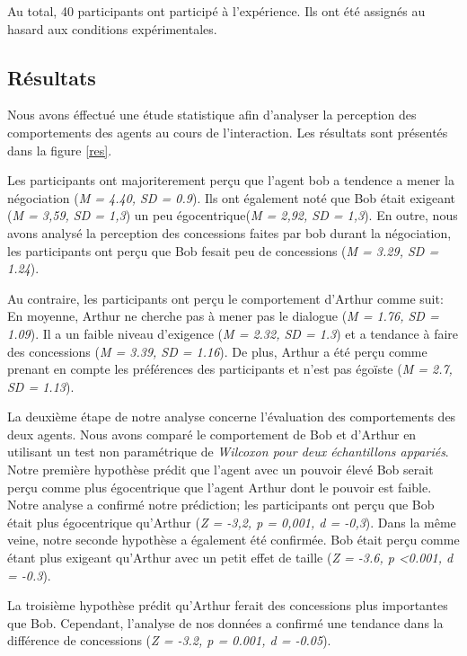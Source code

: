 \documentclass [french]{sig-alternate-05-2015}
\begin{document}
{			Au total, 40 participants ont participé à l'expérience. Ils ont été assignés au hasard aux conditions expérimentales.
			
			\subsection{Résultats}
				Nous avons éffectué une étude statistique afin d'analyser la perception des comportements des agents au cours de l'interaction. Les résultats sont présentés dans la figure \ref{res}.
				
				Les participants ont majoriterement perçu que l'agent bob a tendence a mener la négociation (\emph {M = 4.40, SD = 0.9}). Ils ont également noté que Bob était exigeant (\emph {M = 3,59, SD = 1,3}) un peu égocentrique(\emph {M = 2,92, SD = 1,3}). En outre, nous avons analysé la perception des concessions faites par bob durant la négociation, les participants ont perçu que Bob fesait peu de concessions (\emph {M = 3.29, SD = 1.24}).
				
				Au contraire, les participants ont perçu le comportement d'Arthur comme suit: En moyenne, Arthur ne cherche pas à mener pas le dialogue (\emph {M = 1.76, SD = 1.09}). Il a un faible niveau d'exigence (\emph {M = 2.32, SD = 1.3}) et a tendance à faire des concessions (\emph {M = 3.39, SD = 1.16}). De plus, Arthur a été perçu comme prenant en compte les préférences des participants et n'est pas égoïste (\emph {M = 2.7, SD = 1.13}).
				
				La deuxième étape de notre analyse concerne l'évaluation des comportements des deux agents. Nous avons comparé le comportement de Bob et d'Arthur en utilisant un test non paramétrique de \emph{ Wilcoxon pour deux échantillons appariés}. Notre première hypothèse prédit que l'agent avec un pouvoir élevé Bob serait perçu comme plus égocentrique que l'agent Arthur dont le pouvoir est faible. Notre analyse a confirmé notre prédiction; les participants ont perçu que Bob était plus égocentrique qu'Arthur (\emph {Z = -3,2, p = 0,001, d = -0,3}). Dans la même veine, notre seconde hypothèse a également été confirmée. Bob était perçu comme étant plus exigeant qu'Arthur avec un petit effet de taille (\emph {Z = -3.6, p <0.001, d = -0.3}).
				
				La troisième hypothèse prédit qu'Arthur ferait des concessions plus importantes que Bob. Cependant, l'analyse de nos données a confirmé une tendance dans la différence de concessions (\emph {Z = -3.2, p = 0.001, d = -0.05}).
				
}
\end{document}
